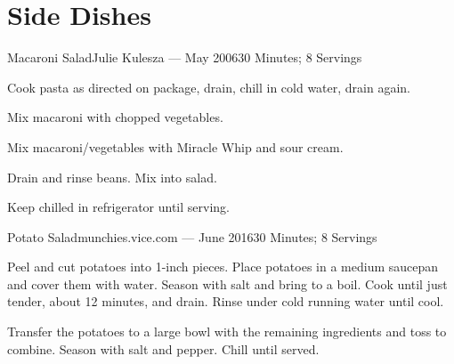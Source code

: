 \documentclass{article}
\begin{document}
\section{Side Dishes}

\begin{recipe}{Macaroni Salad}{Julie Kulesza --- May 2006}{30 Minutes; 8 Servings}

   Cook pasta as directed on package, drain, chill in cold water, drain again.

   Mix macaroni with chopped vegetables.

   Mix macaroni/vegetables with Miracle Whip and sour cream.

   Drain and rinse beans.  Mix into salad.

   \newstep
   Keep chilled in refrigerator until serving.

\end{recipe}

\begin{recipe}{Potato Salad}{munchies.vice.com --- June 2016}{30 Minutes; 8 Servings}

   Peel and cut potatoes into 1-inch pieces. Place potatoes in a medium saucepan
   and cover them with water. Season with salt and bring to a boil. Cook until
   just tender, about 12 minutes, and drain. Rinse under cold running water
   until cool.

   Transfer the potatoes to a large bowl with the remaining ingredients and toss
   to combine. Season with salt and pepper. Chill until served.

\end{recipe}
\end{document}
